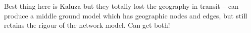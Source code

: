 Best thing here is Kaluza but they totally lost the geography in transit -- can produce a middle ground model which has geographic nodes and edges, but still retains the rigour of the network model. Can get both!










